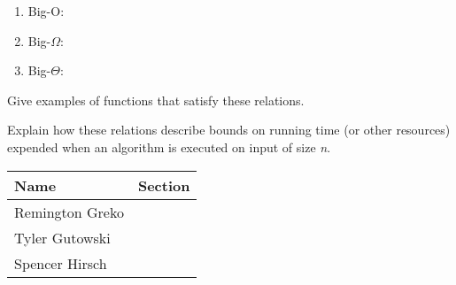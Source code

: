 \documentclass{article}
\begin{document}
\begin{enumerate}
    \item Big-O:
    \item Big-$\Omega$:
    \item Big-$\Theta$:
\end{enumerate}

\noindent Give examples of functions that satisfy these relations.

\medskip

\noindent Explain how these relations describe bounds on running time (or other resources)
expended when an algorithm is executed on input of size \textit{n}.

\pagebreak

\begin{center}
    \begin{tabular}{|p{3cm}|p{6cm}|}
        \hline
        \textbf{Name} & \textbf{Section} \\
        \hline
        Remington Greko &  \\
        \hline
        Tyler Gutowski &  \\
        \hline
        Spencer Hirsch &  \\
        \hline
    \end{tabular}
\end{center}
\end{document}
